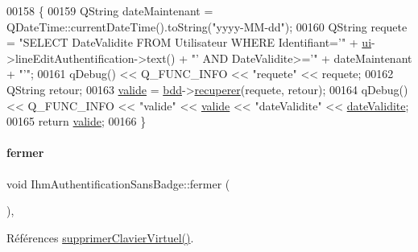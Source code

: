 \begin{DoxyCode}
00158 \{
00159     QString dateMaintenant = QDateTime::currentDateTime().toString(\textcolor{stringliteral}{"yyyy-MM-dd"});
00160     QString requete = \textcolor{stringliteral}{"SELECT DateValidite FROM Utilisateur WHERE Identifiant='"} + 
      \hyperlink{class_ihm_authentification_sans_badge_a95e8a9d049b6e5f262b45e3362d2bbee}{ui}->lineEditAuthentification->text() + \textcolor{stringliteral}{"' AND DateValidite>='"} + dateMaintenant + \textcolor{stringliteral}{"'"};
00161     qDebug() << Q\_FUNC\_INFO << \textcolor{stringliteral}{"requete"} << requete;
00162     QString retour;
00163     \hyperlink{class_ihm_authentification_sans_badge_a653eb9abd54ba736b3d98b994a7e4f1f}{valide} = \hyperlink{class_ihm_authentification_sans_badge_acf93b261335b6128af77de61994b9491}{bdd}->\hyperlink{class_base_de_donnees_a77539baad389f5acf754cd2cd452403e}{recuperer}(requete, retour);
00164     qDebug() << Q\_FUNC\_INFO << \textcolor{stringliteral}{"valide"} << \hyperlink{class_ihm_authentification_sans_badge_a653eb9abd54ba736b3d98b994a7e4f1f}{valide} << \textcolor{stringliteral}{"dateValidite"} << 
      \hyperlink{class_ihm_authentification_sans_badge_afd0f3b5e59208d58be78f0cb741d4be7}{dateValidite};
00165     \textcolor{keywordflow}{return} \hyperlink{class_ihm_authentification_sans_badge_a653eb9abd54ba736b3d98b994a7e4f1f}{valide};
00166 \}
\end{DoxyCode}
\mbox{\label{class_ihm_authentification_sans_badge_aa06ddc2a4b8d578fecfb9e37dd577858}} 
\paragraph{\texorpdfstring{fermer}{fermer}}
{\footnotesize\ttfamily void Ihm\+Authentification\+Sans\+Badge\+::fermer (\begin{DoxyParamCaption}{ }\end{DoxyParamCaption})\hspace{0.3cm}{\ttfamily [private]}, {\ttfamily [slot]}}



Références \hyperlink{class_ihm_authentification_sans_badge_ab90d91062763a53ac39df5a9fdc4da85}{supprimer\+Clavier\+Virtuel()}.



